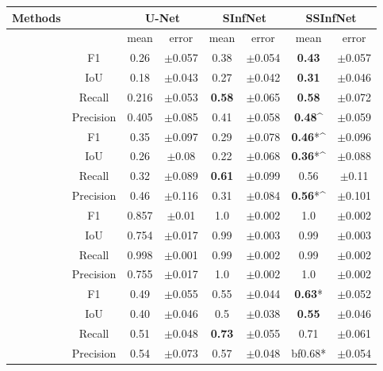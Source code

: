 \begin{table}[!h]
	\centering
	\begin{tabular}{ |c|c|c|c|c|c|c|c| }
		\hline
		Methods & & \multicolumn{2}{c|}{U-Net} & \multicolumn{2}{c|}{SInfNet} & \multicolumn{2}{c|}{SSInfNet}  \\ \hline
		&  &mean & error & mean & error & mean & error \\ \hline
		
		\multirow{4}{*}{\rotatebox[origin=c]{90}{GGO}} 
		& F1 & 0.26 & $\pm$0.057 & 0.38 &$\pm$0.054 & \textbf{0.43} & $\pm$0.057 \\ \cline{2-8}
		& IoU & 0.18 &$\pm$0.043 &0.27 &$\pm$0.042 &
		\textbf{0.31} &$\pm$0.046 \\ \cline{2-8}
		& Recall & 0.216 &$\pm$0.053 &\textbf{0.58} &$\pm$0.065 &\textbf{0.58} &$\pm$0.072 \\ \cline{2-8}
		& Precision & 0.405 &$\pm$0.085 &0.41 &$\pm$0.058 &
		\textbf{0.48}\^ &$\pm$0.059 \\ \cline{2-8}
		\hline \hline
		
		\multirow{4}{*}{\rotatebox[origin=c]{90}{Cons}} 
		& F1 & 0.35 &$\pm$0.097 &0.29 &$\pm$0.078 &\textbf{0.46}*\^ &$\pm$0.096 \\ \cline{2-8}
		& IoU & 0.26& $\pm$0.08&0.22 &$\pm$0.068 &\textbf{0.36}*\^ &$\pm$0.088 \\ \cline{2-8}
		& Recall &0.32 &$\pm$0.089 &\textbf{0.61} &$\pm$0.099 &0.56 &$\pm$0.11 \\ \cline{2-8}
		& Precision & 0.46 &$\pm$0.116 &0.31 &$\pm$0.084 &\textbf{0.56}*\^ &$\pm$0.101 \\ \cline{2-8}
		\hline \hline
		
		\multirow{4}{*}{\rotatebox[origin=c]{90}{Background}} 
		& F1 & 0.857&$\pm$0.01 &1.0 &$\pm$0.002 &1.0 &$\pm$0.002 \\ \cline{2-8}
		& IoU & 0.754&$\pm$0.017 &0.99 &$\pm$0.003 &0.99 &$\pm$0.003 \\ \cline{2-8}
		& Recall &0.998 &$\pm$0.001 &0.99 &$\pm$0.002 &0.99 &$\pm$0.002 \\ \cline{2-8}
		& Precision &0.755 &$\pm$0.017 &1.0 &$\pm$0.002 &1.0 &$\pm$0.002 \\ \cline{2-8}
		\hline \hline
		
		\multirow{4}{*}{\rotatebox[origin=c]{90}{Overall}} 
		& F1 &0.49 &$\pm$0.055 &0.55 &$\pm$0.044 &\textbf{0.63}* &$\pm$0.052 \\ \cline{2-8}
		& IoU & 0.40 &$\pm$0.046 &0.5 &$\pm$0.038 &\textbf{0.55} &$\pm$0.046 \\ \cline{2-8}
		& Recall &0.51 &$\pm$0.048 &\textbf{0.73} &$\pm$0.055 &0.71 &$\pm$0.061 \\ \cline{2-8}
		& Precision &0.54 &$\pm$0.073 &0.57 &$\pm$0.048 &\text
		bf{0.68}* &$\pm$0.054 \\ \cline{2-8}
		\hline \hline
		

\end{tabular}
\end{table}
